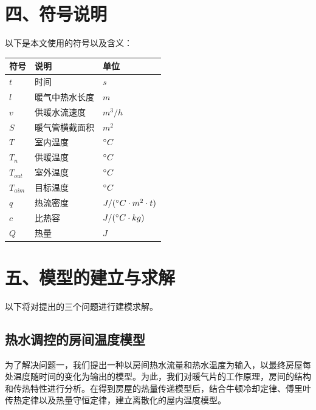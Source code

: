 \documentclass{my_paper}
\begin{document}
\section{四、符号说明}


以下是本文使用的符号以及含义：
\begin{table}[h]%
    \centering
    \begin{tabular}{p{2.0cm}<{\centering}p{9.0cm}<{\centering}p{2.0cm}<{\centering}}
    \hline
    符号 & 说明 & 单位 \\ %
    \hline
    $t$ & 时间 &  $s$\\
    $l$ & 暖气中热水长度 &  $m$\\
    $v$ & 供暖水流速度 &  $m^3/h$\\
    $S$ & 暖气管横截面积 &  $m^2$\\
    $T$ & 室内温度 &  $\degree C$\\
    $T_n$ & 供暖温度 &  $\degree C$\\
    $T_{out}$ & 室外温度 &  $\degree C$\\
    $T_{aim}$ & 目标温度 &  $\degree C$\\
    $q$ & 热流密度 &  $J/(\degree C \cdot m^2 \cdot t)$\\
    $c$ & 比热容 &  $J/(\degree C \cdot kg)$\\
    $Q$ & 热量 &  $J$\\
    
    \hline
    \end{tabular}
\end{table}
\newpage
\section{五、模型的建立与求解}

以下将对提出的三个问题进行建模求解。
\subsection{热水调控的房间温度模型}

为了解决问题一，我们提出一种以房间热水流量和热水温度为输入，以最终房屋每处温度随时间的变化为输出的模型。为此，我们对暖气片的工作原理，房间的结构和传热特性进行分析。在得到房屋的热量传递模型后，结合牛顿冷却定律、傅里叶传热定律以及热量守恒定律，建立离散化的屋内温度模型。
\end{document}

